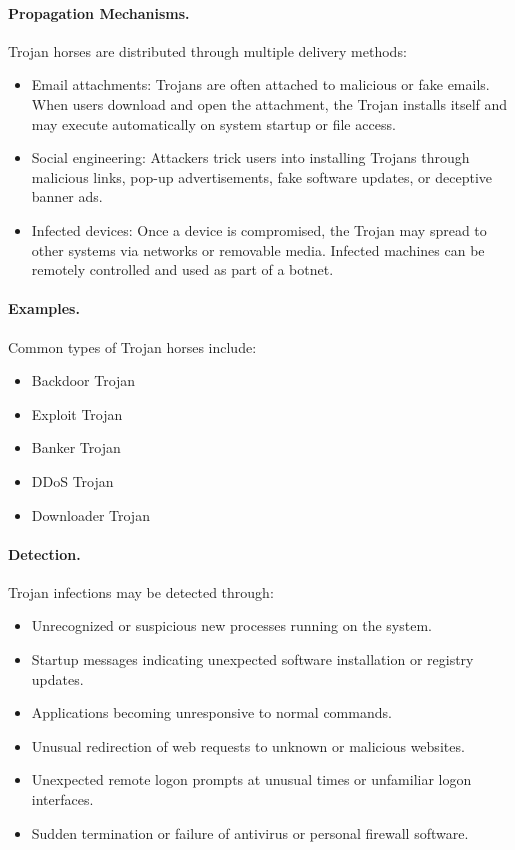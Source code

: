 \paragraph{Propagation Mechanisms.}
Trojan horses are distributed through multiple delivery methods:

\begin{itemize}
  \item Email attachments: Trojans are often attached to malicious or fake emails. When users download and open the attachment, the Trojan installs itself and may execute automatically on system startup or file access.
  \item Social engineering: Attackers trick users into installing Trojans through malicious links, pop-up advertisements, fake software updates, or deceptive banner ads.
  \item Infected devices: Once a device is compromised, the Trojan may spread to other systems via networks or removable media. Infected machines can be remotely controlled and used as part of a botnet.
\end{itemize}

\paragraph{Examples.}
Common types of Trojan horses include:

\begin{itemize}
  \item Backdoor Trojan
  \item Exploit Trojan
  \item Banker Trojan
  \item DDoS Trojan
  \item Downloader Trojan
\end{itemize}

\paragraph{Detection.}
Trojan infections may be detected through:

\begin{itemize}
  \item Unrecognized or suspicious new processes running on the system.
  \item Startup messages indicating unexpected software installation or registry updates.
  \item Applications becoming unresponsive to normal commands.
  \item Unusual redirection of web requests to unknown or malicious websites.
  \item Unexpected remote logon prompts at unusual times or unfamiliar logon interfaces.
  \item Sudden termination or failure of antivirus or personal firewall software.
\end{itemize}

